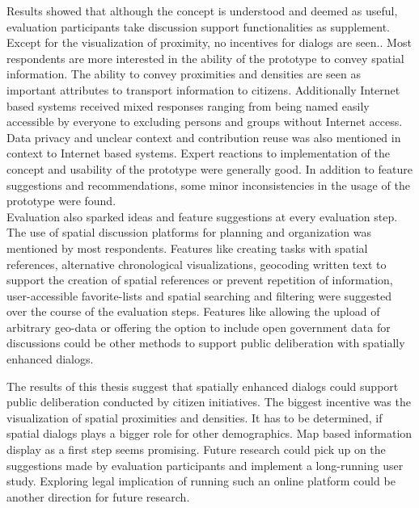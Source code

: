 Results showed that although the concept is understood and deemed as useful, evaluation participants take discussion support functionalities as supplement. Except for the visualization of proximity, no incentives for dialogs are seen.. Most respondents are more interested in the ability of the prototype to convey spatial information. The ability to convey proximities and densities are seen as important attributes to transport information to citizens. Additionally Internet based systems received mixed responses ranging from being named easily accessible by everyone to excluding persons and groups without Internet access. Data privacy and unclear context and contribution reuse was also mentioned in context to Internet based systems. Expert reactions to implementation of the concept and usability of the prototype were generally good. In addition to feature suggestions and recommendations, some minor inconsistencies in the usage of the prototype were found.\\
Evaluation also sparked ideas and feature suggestions at every evaluation step. The use of spatial discussion platforms for planning and organization was mentioned by most respondents. Features like creating tasks with spatial references, alternative chronological visualizations, geocoding written text to support the creation of spatial references or prevent repetition of information, user-accessible favorite-lists and spatial searching and filtering were suggested over the course of the evaluation steps. Features like allowing the upload of arbitrary geo-data or offering the option to include open government data for discussions could be other methods to support public deliberation with spatially enhanced dialogs.


The results of this thesis suggest that spatially enhanced dialogs could support public deliberation conducted by citizen initiatives. The biggest incentive was the visualization of spatial proximities and densities. It has to be determined, if spatial dialogs plays a bigger role for other demographics. Map based information display as a first step seems promising. Future research could pick up on the suggestions made by evaluation participants and implement a long-running user study. Exploring legal implication of running such an online platform could be another direction for future research.
